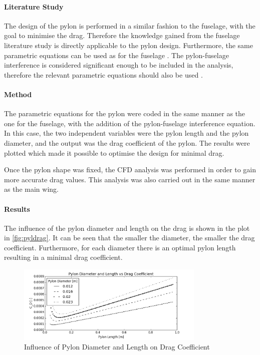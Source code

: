 \paragraph{Literature Study} The design of the pylon is performed in a similar fashion to the fuselage, with the goal to minimise the drag. Therefore the knowledge gained from the fuselage literature study is directly applicable to the pylon design. Furthermore, the same parametric equations can be used as for the fuselage \cite[73]{roskam}. The pylon-fuselage interference is considered significant enough to be included in the analysis, therefore the relevant parametric equations should also be used \cite[77]{roskam}.

\paragraph{Method} The parametric equations for the pylon were coded in the same manner as the one for the fuselage, with the addition of the pylon-fuselage interference equation. In this case, the two independent variables were the pylon length and the pylon diameter, and the output was the drag coefficient of the pylon. The results were plotted which made it possible to optimise the design for minimal drag.

Once the pylon shape was fixed, the CFD analysis was performed in order to gain more accurate drag values. This analysis was also carried out in the same manner as the main wing.

\paragraph{Results} The influence of the pylon diameter and length on the drag is shown in the plot in \autoref{fig:pyldrag}. It can be seen that the smaller the diameter, the smaller the drag coefficient. Furthermore, for each diameter there is an optimal pylon length resulting in a minimal drag coefficient.

\begin{figure}[H]
    \centering
    \includegraphics[width=0.8\textwidth]{Aerodynamics/Figures/pyldrag}
    \caption{Influence of Pylon Diameter and Length on Drag Coefficient}
    \label{fig:pyldrag}
\end{figure}

